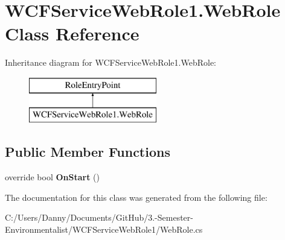 \hypertarget{class_w_c_f_service_web_role1_1_1_web_role}{}\section{W\+C\+F\+Service\+Web\+Role1.\+Web\+Role Class Reference}
\label{class_w_c_f_service_web_role1_1_1_web_role}
Inheritance diagram for W\+C\+F\+Service\+Web\+Role1.\+Web\+Role\+:\begin{figure}[H]
\begin{center}
\leavevmode
\includegraphics[height=2.000000cm]{class_w_c_f_service_web_role1_1_1_web_role}
\end{center}
\end{figure}
\subsection*{Public Member Functions}
\begin{DoxyCompactItemize}
\item 
\hypertarget{class_w_c_f_service_web_role1_1_1_web_role_a8c4c2d91db91aba6cb62a3a5e90d0002}{}override bool {\bfseries On\+Start} ()\label{class_w_c_f_service_web_role1_1_1_web_role_a8c4c2d91db91aba6cb62a3a5e90d0002}

\end{DoxyCompactItemize}


The documentation for this class was generated from the following file\+:\begin{DoxyCompactItemize}
\item 
C\+:/\+Users/\+Danny/\+Documents/\+Git\+Hub/3.-\/\+Semester-\/\+Environmentalist/\+W\+C\+F\+Service\+Web\+Role1/Web\+Role.\+cs\end{DoxyCompactItemize}
